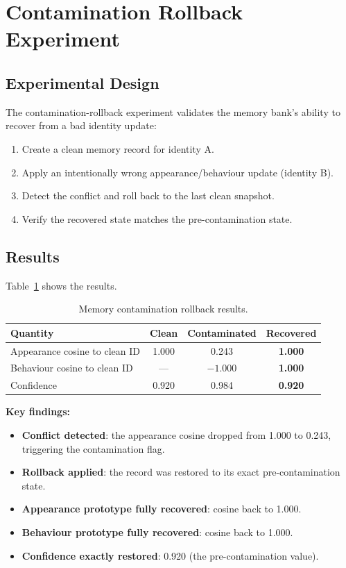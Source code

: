 \documentclass[11pt,a4paper]{article}
\begin{document}
\section{Contamination Rollback Experiment}

\subsection{Experimental Design}
The contamination-rollback experiment validates the memory bank's ability to recover from a bad identity update:
\begin{enumerate}[leftmargin=2em]
    \item Create a clean memory record for identity A.
    \item Apply an intentionally wrong appearance/behaviour update (identity B).
    \item Detect the conflict and roll back to the last clean snapshot.
    \item Verify the recovered state matches the pre-contamination state.
\end{enumerate}

\subsection{Results}
Table~\ref{tab:rollback} shows the results.

\begin{table}[H]
\centering
\caption{Memory contamination rollback results.}
\label{tab:rollback}
\begin{tabular}{@{}lccc@{}}
\toprule
\textbf{Quantity} & \textbf{Clean} & \textbf{Contaminated} & \textbf{Recovered} \\
\midrule
Appearance cosine to clean ID & 1.000 & 0.243 & \textbf{1.000} \\
Behaviour cosine to clean ID & --- & $-1.000$ & \textbf{1.000} \\
Confidence & 0.920 & 0.984 & \textbf{0.920} \\
\bottomrule
\end{tabular}
\end{table}

\textbf{Key findings:}
\begin{itemize}[leftmargin=2em]
    \item \textbf{Conflict detected}: the appearance cosine dropped from 1.000 to 0.243, triggering the contamination flag.
    \item \textbf{Rollback applied}: the record was restored to its exact pre-contamination state.
    \item \textbf{Appearance prototype fully recovered}: cosine back to 1.000.
    \item \textbf{Behaviour prototype fully recovered}: cosine back to 1.000.
    \item \textbf{Confidence exactly restored}: 0.920 (the pre-contamination value).
\end{itemize}
\end{document}
